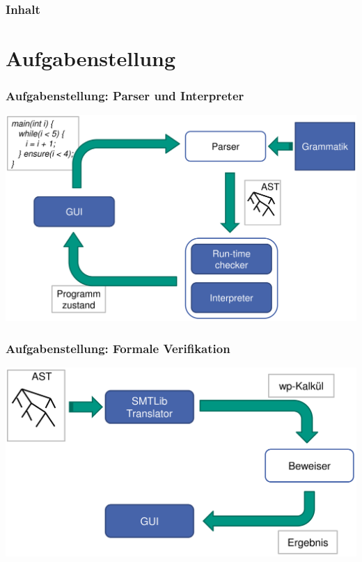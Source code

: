 \documentclass{beamer}
\author{Simon Bischof \and Jan Haag \and Adrian Herrmann \and Lin Jin \and Tobias Schlumberger \and Matthias Schnetz}
\title{\WProve}
\institute{Institut f\"ur Theoretische Informatik}
\begin{document}
\begin{frame}
\maketitle
\end{frame}

\begin{frame}
\frametitle{Inhalt}
\tableofcontents
\end{frame}

\section{Aufgabenstellung}
\begin{frame}
\frametitle{Aufgabenstellung: Parser und Interpreter}
\begin{center}
\includegraphics[scale=0.43]{images/ParserInterpreter.png}
\end{center}
\end{frame}

\begin{frame}
\frametitle{Aufgabenstellung: Formale Verifikation}
\begin{center}
\includegraphics[scale=0.43]{images/SMTLibTranslator.png}
\end{center}
\end{frame}
\end{document}
